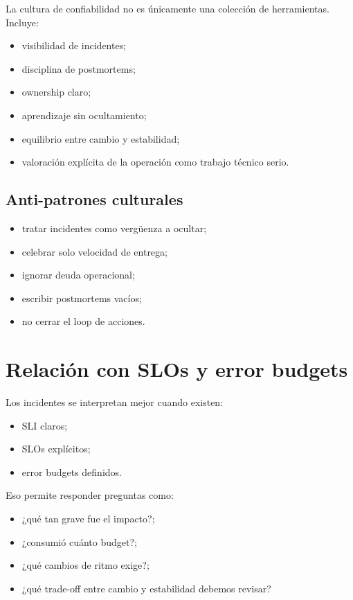 \documentclass[variant=apuntes,cover=institutional,mode=screen]{ua-engineering-v6-article}
\begin{document}
La cultura de confiabilidad no es únicamente una colección de herramientas. Incluye:

\begin{itemize}
\item visibilidad de incidentes;
\item disciplina de postmortems;
\item ownership claro;
\item aprendizaje sin ocultamiento;
\item equilibrio entre cambio y estabilidad;
\item valoración explícita de la operación como trabajo técnico serio.
\end{itemize}

\subsection{Anti-patrones culturales}

\begin{itemize}
\item tratar incidentes como vergüenza a ocultar;
\item celebrar solo velocidad de entrega;
\item ignorar deuda operacional;
\item escribir postmortems vacíos;
\item no cerrar el loop de acciones.
\end{itemize}

\section{Relación con SLOs y error budgets}

Los incidentes se interpretan mejor cuando existen:
\begin{itemize}
\item SLI claros;
\item SLOs explícitos;
\item error budgets definidos.
\end{itemize}

Eso permite responder preguntas como:
\begin{itemize}
\item ¿qué tan grave fue el impacto?;
\item ¿consumió cuánto budget?;
\item ¿qué cambios de ritmo exige?;
\item ¿qué trade-off entre cambio y estabilidad debemos revisar?
\end{itemize}
\end{document}
